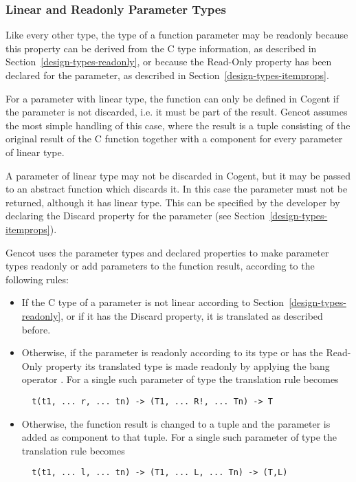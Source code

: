 \subsubsection{Linear and Readonly Parameter Types}

Like every other type, the type of a function parameter may be readonly because this property can be derived
from the C type information, as described in Section~\ref{design-types-readonly}, or because the Read-Only property
has been declared for the parameter, as described in Section~\ref{design-types-itemprops}.

For a parameter with linear type, the function can only be defined in Cogent if the parameter is not discarded,
i.e. it must be part of the result. Gencot assumes the most simple handling of this case, where the result
is a tuple consisting of the original result of the C function together with a component for every parameter
of linear type. 

A parameter of linear type may not be discarded in Cogent, but it may be passed to an abstract function which discards
it. In this case the parameter must not be returned, although it has linear type. This can be specified by the 
developer by declaring the Discard property for the parameter (see Section~\ref{design-types-itemprops}).

Gencot uses the parameter types and declared properties to make parameter types readonly or
add parameters to the function result, according to the following rules:
\begin{itemize}
\item If the C type of a parameter is not linear according to Section~\ref{design-types-readonly}, or if it
has the Discard property, it is translated as described before.
\item Otherwise, if the parameter is readonly according to its type or has the Read-Only property
its translated type is made readonly by applying the
bang operator \code{!}. For a single such parameter of type  the translation rule becomes
\begin{verbatim}
  t(t1, ... r, ... tn) -> (T1, ... R!, ... Tn) -> T
\end{verbatim}
\item Otherwise, the function result is changed to a tuple and the parameter is added as component to that tuple.
For a single such parameter of type  the translation rule becomes
\begin{verbatim}
  t(t1, ... l, ... tn) -> (T1, ... L, ... Tn) -> (T,L)
\end{verbatim}
\end{itemize}

